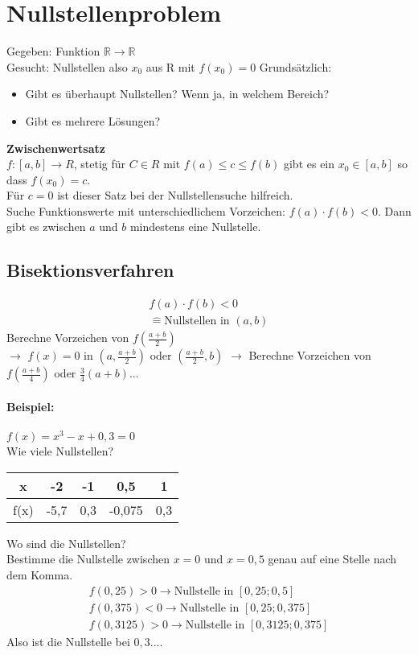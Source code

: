 \documentclass{scrartcl}
\begin{document}
\section{Nullstellenproblem}
Gegeben: Funktion $\mathbb{R} \rightarrow \mathbb{R}$\\
Gesucht: Nullstellen also $x_0$ aus R mit $f(x_0)=0$
Grundsätzlich:
\begin{itemize}
\item Gibt es überhaupt Nullstellen? Wenn ja, in welchem Bereich?
\item Gibt es mehrere Lösungen?
\end{itemize}

\textbf{Zwischenwertsatz}\\
$f:[a,b]\rightarrow R$, stetig für $C \in R$ mit $f(a) \leq c \leq f(b)$ gibt es ein $x_0 \in [a,b]$ so dass $f(x_0)=c$.\\
Für $c=0$ ist dieser Satz bei der Nullstellensuche hilfreich. \\
Suche Funktionswerte mit unterschiedlichem Vorzeichen: $f(a) \cdot f(b) < 0$.
Dann gibt es zwischen $a$ und $b$ mindestens eine Nullstelle.

\subsection{Bisektionsverfahren}
\begin{align*}
f(a) \cdot f(b)<0 \\
\hat{=} \text{Nullstellen in } (a,b) 
\end{align*}
Berechne Vorzeichen von $f(\frac{a+b}{2})$ \\
$\rightarrow$ $f(x)=0$ in $(a, \frac{a+b}{2})$ oder $(\frac{a+b}{2},b)$
$\rightarrow$ Berechne Vorzeichen von $f(\frac{a+b}{4})$ oder $\frac{3}{4}(a+b)$...\\
\\
\textbf{Beispiel:}\\ \\
$f(x)=x^3-x+0,3=0$\\
Wie viele Nullstellen?
\\
\begin{center}
\begin{tabular}{|c|c|c|c|c|}
\hline 
x & -2 & -1 & 0,5 & 1 \\ 
\hline 
f(x) & -5,7 & 0,3 & -0,075 & 0,3 \\ 
\hline 
\end{tabular} 
\end{center}
Wo sind die Nullstellen?\\
Bestimme die Nullstelle zwischen $x=0$ und $x=0,5$ genau auf eine Stelle nach dem Komma.
\begin{align*}
f(0,25)>0 \rightarrow \text{Nullstelle in } [0,25;0,5]\\
f(0,375)<0 \rightarrow \text{Nullstelle in } [0,25;0,375]\\
f(0,3125)>0 \rightarrow \text{Nullstelle in } [0,3125;0,375]
\end{align*}
Also ist die Nullstelle bei $0,3...$.
\end{document}
